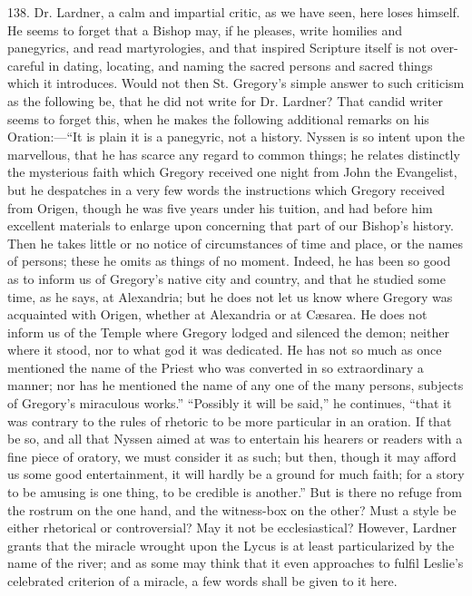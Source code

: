 138.
Dr. Lardner, a calm and impartial critic, as we have seen, here loses
himself. He seems to forget that a Bishop may, if he pleases, write
homilies and panegyrics, and read martyrologies, and that inspired
Scripture itself is not over-careful in dating, locating, and naming
the sacred persons and sacred things which it introduces. Would not
then St. Gregory's simple answer to such criticism as the following
be, that he did not write for Dr. Lardner? That candid writer seems to
forget this, when he makes the following additional remarks on his
Oration:—``It is plain it is a panegyric, not a history. Nyssen is so
intent upon the marvellous, that he has scarce any regard to common
things; he relates distinctly the mysterious faith which Gregory
received one night from John the Evangelist, but he despatches in a
very few words the instructions which Gregory received from Origen,
though he was five years under his tuition, and had before him
excellent materials to enlarge upon concerning that part of our
Bishop's history. Then he takes little or no notice of circumstances
of time and place, or the names of persons; these he omits as things
of no moment. Indeed, he has been so good as to inform us of Gregory's
native city and country, and that he studied some time, as he says, at
Alexandria; but he does not let us know where Gregory was acquainted
with Origen, whether at Alexandria or at Cæsarea. He does not inform
us of the Temple where Gregory lodged and silenced the demon; neither
where it stood, nor to what god it was dedicated. He has not so much
as once mentioned the name of the Priest who was converted in so
extraordinary a manner; nor has he mentioned the name of any one of
the many persons, subjects of Gregory's miraculous works.'' ``Possibly
it will be said,'' he continues, ``that it was contrary to the rules of
rhetoric to be more particular in an oration. If that be so, and all
that Nyssen aimed at was to entertain his hearers or readers with a
fine piece of oratory, we must consider it as such; but then, though
it may afford us some good entertainment, it will hardly be a ground
for much faith; for a story to be amusing is one thing, to be credible
is another.'' But is there no refuge from the rostrum on the one hand,
and the witness-box on the other? Must a style be either rhetorical or
controversial? May it not be ecclesiastical? However, Lardner grants
that the miracle wrought upon the Lycus is at least
particularized by the name of the river; and as some may think that it
even approaches to fulfil Leslie's celebrated criterion of a miracle,
a few words shall be given to it here.

